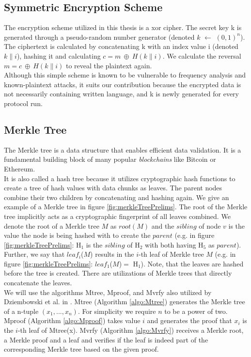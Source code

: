 \documentclass{cacthesis}
\newcounter{protocol}
\begin{document}
            \subsection{Symmetric Encryption Scheme}
            \label{sub:SymmetricEncryptionScheme}
	        The encryption scheme utilized in this thesis is a xor cipher. The secret key k is generated through a pseudo-random number generator (denoted $k$ $\leftarrow$ $(0, 1)^n$). The ciphertext is calculated by concatenating k with an index value i (denoted $k\|i$), hashing it and calculating  $c = m \ \oplus \ H(k\|i)$. We calculate the reversal $m = c \ \oplus \ H(k\|i)$ to reveal the plaintext again. \\
            Although this simple scheme is known to be vulnerable to frequency analysis and known-plaintext attacks, it suits our contribution because the encrypted data is not necessarily containing written language, and k is newly generated for every protocol run.

            \subsection{Merkle Tree}
            \label{sub:MerkleTree}
	        The Merkle tree is a data structure that enables efficient data validation. It is a fundamental building block of many popular \textit{blockchains} like Bitcoin or Ethereum. \\
            It is also called a hash tree because it utilizes cryptographic hash functions to create a tree of hash values with data chunks as leaves. The parent nodes combine their two children by concatenating and hashing again. We give an example of a Merkle tree in figure \ref{fig:merkleTreePrelims}. The root of the Merkle tree implicitly acts as a cryptographic fingerprint of all leaves combined. We denote the root of a Merkle tree $M$ as $root(M)$ and the $sibling$ of node $v$ is the value the node is being hashed with to create the $parent$ (e.g. in figure \ref{fig:merkleTreePrelims}: H$_1$ is the $sibling$ of H$_2$ with both having H$_5$ as $parent$). Further, we say that $leaf_i$($M$) results in the $i$-th leaf of Merkle tree $M$ (e.g. in figure \ref{fig:merkleTreePrelims}: $leaf_1$($M$)$=$ H$_1$). Note, that the leaves are hashed before the tree is created. There are utilizations of Merkle trees that directly concatenate the leaves. \\
            We will use the algorithms \textsf{Mtree}, \textsf{Mproof}, and \textsf{Mvrfy} also utilized by Dziembowski et al. in \cite{10.1145/3243734.3243857}. \textsf{Mtree} (Algorithm \ref{algo:Mtree}) generates the Merkle tree of a n-tuple $(x_1, ..., x_n)$. For simplicity we require $n$ to be a power of two. \textsf{Mproof} (Algorithm \ref{algo:Mproof}) takes value $i$ and generates the proof that $x_i$ is the $i$-th leaf of \textsf{Mtree(x)}. \textsf{Mvrfy} (Algorithm \ref{algo:Mvrfy}) receives a Merkle root, a Merkle proof and a leaf and verifies if the leaf is indeed part of the corresponding Merkle tree based on the given proof. 
            
\end{document}
